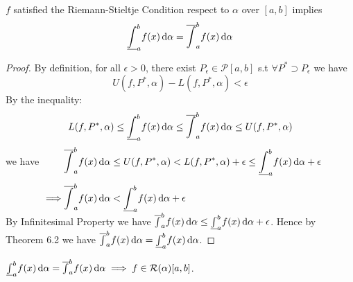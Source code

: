 \documentclass[
	UTF-8,
	11pt, %
	a4paper, %
]{LegrandOrangeBook}
\begin{document}
    \newpage

    \newcommand{\lowerint}{\underline{\int}}
    \newcommand{\upperint}{\overline{\int}}

    \begin{lemma}
        $f$ satisfied the
        Riemann-Stieltje Condition respect to $\alpha$ over $[a,b] $ implies
        $$ \underline{\int}_{a}^{b}f(x) \, \mathrm{d} \alpha = \overline{\int}_{a}^{b}f(x) \, \mathrm{d} \alpha$$
    \end{lemma} 

    \begin{proof}
        By definition, for all  $\epsilon > 0$, 
        there exist $P_{\epsilon} \in \mathcal{P}[a,b]$ s.t $\forall P^{*} \supset P_{\epsilon}$ we have
        $$
            U(f,P^{*},\alpha) - L(f,P^{*},\alpha) < \epsilon
        $$
        By the inequality:
        $$
            L(f,P^*,\alpha) \leq \lowerint^{b}_a f(x) \diffd \alpha \leq \upperint^{b}_a f(x) \diffd \alpha \leq U(f,P^*,\alpha)
        $$
        we have
        $
        \begin{aligned}[t]
        &\upperint^{b}_a f(x) \diffd \alpha \leq U(f,P^*,\alpha) < L(f,P^*,\alpha) +\epsilon \leq \lowerint^{b}_a f(x) \diffd \alpha+\epsilon\\[1ex]
        \implies &\upperint^{b}_a f(x) \diffd \alpha < \lowerint^{b}_a f(x) \diffd \alpha + \epsilon
        \end{aligned}
        $\\

        By Infinitesimal Property we have 
        $\upperint^{b}_a f(x) \diffd \alpha \leq \lowerint^{b}_a f(x) \diffd \alpha + \epsilon$.
        Hence by Theorem 6.2 we have $\upperint^{b}_a f(x) \diffd \alpha = \lowerint^{b}_a f(x) \diffd \alpha$.
    \end{proof}

    \begin{lemma}
        $ \underline{\int}_{a}^{b}f(x) \, \mathrm{d} \alpha = \overline{\int}_{a}^{b}f(x) \, \mathrm{d} \alpha \implies f\in \mathcal{R}(\alpha)[a,b]$.
    \end{lemma}
\end{document}
